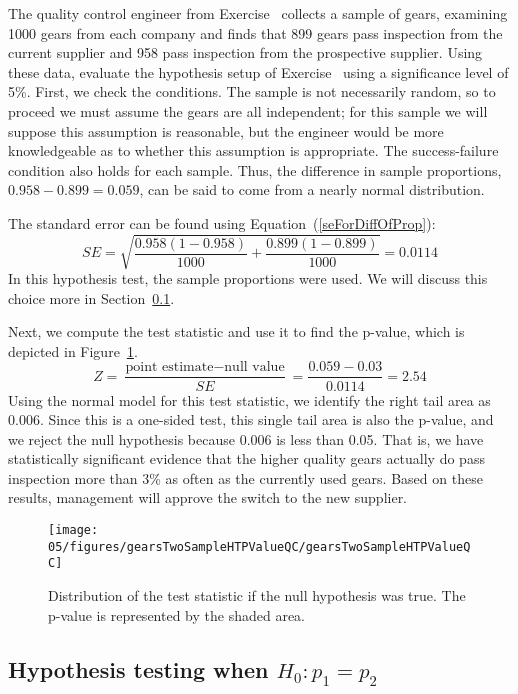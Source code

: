 \begin{example}{The quality control engineer from Exercise~ collects a sample of gears, examining 1000 gears from each company and finds that 899 gears pass inspection from the current supplier and 958 pass inspection from the prospective supplier. Using these data, evaluate the hypothesis setup of Exercise~ using a significance level of 5\%.}
First, we check the conditions. The sample is not necessarily random, so to proceed we must assume the gears are all independent; for this sample we will suppose this assumption is reasonable, but the engineer would be more knowledgeable as to whether this assumption is appropriate. The success-failure condition also holds for each sample. Thus, the difference in sample proportions, $0.958-0.899=0.059$, can be said to come from a nearly normal distribution.

The standard error can be found using Equation~(\ref{seForDiffOfProp}):
$$SE = \sqrt{\frac{0.958(1-0.958)}{1000} + \frac{0.899(1-0.899)}{1000}} = 0.0114$$
In this hypothesis test, the sample proportions were used. We will discuss this choice more in Section~\ref{pooledHTForProportionsSection}.

Next, we compute the test statistic and use it to find the p-value, which is depicted in Figure~\ref{gearsTwoSampleHTPValueQC}.
$$Z = \frac{\text{point estimate} - \text{null value}}{SE} = \frac{0.059 - 0.03}{0.0114} = 2.54$$
Using the normal model for this test statistic, we identify the right tail area as 0.006. Since this is a one-sided test, this single tail area is also the p-value, and we reject the null hypothesis because 0.006 is less than 0.05. That is, we have statistically significant evidence that the higher quality gears actually do pass inspection more than 3\% as often as the currently used gears. Based on these results, management will approve the switch to the new supplier.
\end{example}

\begin{figure}
\centering
\texttt{[image: 05/figures/gearsTwoSampleHTPValueQC/gearsTwoSampleHTPValueQC]}
\caption{Distribution of the test statistic if the null hypothesis was true. The p-value is represented by the shaded area.}
\label{gearsTwoSampleHTPValueQC}
\end{figure}

\subsection{Hypothesis testing when $H_0: p_1 = p_2$}
\label{pooledHTForProportionsSection}

